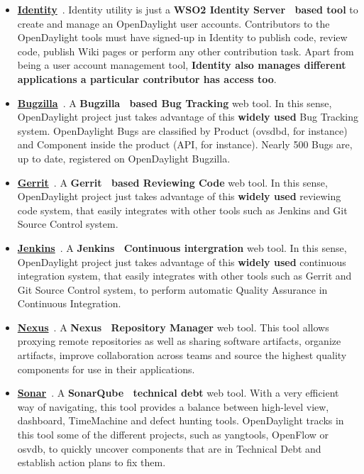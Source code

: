 \documentclass[a4paper, 12pt]{book}
\begin{document}
\begin{itemize}
\item{\textbf{\underline{Identity}}}~\cite{OpenDaylightIdentity}. Identity utility is just a \textbf{WSO2 Identity Server~\cite{WSO2IdentityServer} based tool} to create and manage an OpenDaylight user accounts. Contributors to the OpenDaylight tools must have signed-up in Identity to publish code, review code, publish Wiki pages or perform any other contribution task. Apart from being a user account management tool, \textbf{Identity also manages different applications a particular contributor has access too}.
\item{\textbf{\underline{Bugzilla}}}~\cite{OpenDaylightBugzilla}. A \textbf{Bugzilla~\cite{Bugzilla} based Bug Tracking} web tool. In this sense, OpenDaylight project just takes advantage of this \textbf{widely used} Bug Tracking system. OpenDaylight Bugs are classified by Product (ovsdbd, for instance) and Component inside the product (API, for instance). Nearly 500 Bugs are, up to date, registered on OpenDaylight Bugzilla.
\item{\textbf{\underline{Gerrit}}}~\cite{OpenDaylightGerrit}. A \textbf{Gerrit~\cite{Gerrit} based Reviewing Code} web tool. In this sense, OpenDaylight project just takes advantage of this \textbf{widely used} reviewing code system, that easily integrates with other tools such as Jenkins and Git Source Control system.
\item{\textbf{\underline{Jenkins}}}~\cite{OpenDaylightJenkins}. A \textbf{Jenkins~\cite{Jenkins} Continuous intergration} web tool. In this sense, OpenDaylight project just takes advantage of this \textbf{widely used} continuous integration system, that easily integrates with other tools such as Gerrit and Git Source Control system, to perform automatic Quality Assurance in Continuous Integration.
\item{\textbf{\underline{Nexus}}}~\cite{OpenDaylightNexus}. A \textbf{Nexus~\cite{SonatypeNexus} Repository Manager} web tool. This tool allows proxying remote repositories as well as sharing software artifacts, organize artifacts, improve collaboration across teams and source the highest quality components for use in their applications.
\item{\textbf{\underline{Sonar}}}~\cite{OpenDaylightSonar}. A \textbf{SonarQube~\cite{SonarQube} technical debt} web tool. With a very efficient way of navigating, this tool provides a balance between high-level view, dashboard, TimeMachine and defect hunting tools. OpenDaylight tracks in this tool some of the different projects, such as yangtools, OpenFlow or osvdb, to quickly uncover components that are in Technical Debt and establish action plans to fix them.
\end{itemize}
\end{document}
